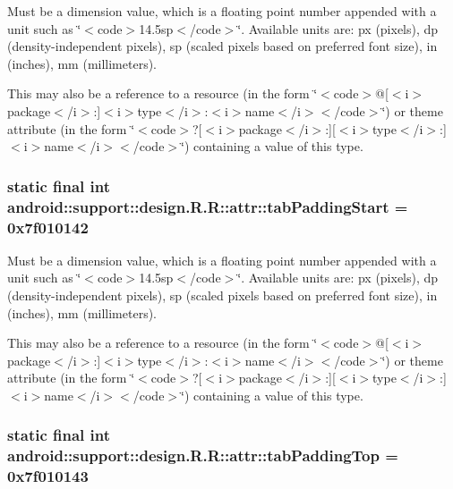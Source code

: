 Must be a dimension value, which is a floating point number appended with a unit such as \char`\"{}$<$code$>$14.5sp$<$/code$>$\char`\"{}. Available units are: px (pixels), dp (density-independent pixels), sp (scaled pixels based on preferred font size), in (inches), mm (millimeters). 

This may also be a reference to a resource (in the form \char`\"{}$<$code$>$@\mbox{[}$<$i$>$package$<$/i$>$:\mbox{]}$<$i$>$type$<$/i$>$:$<$i$>$name$<$/i$>$$<$/code$>$\char`\"{}) or theme attribute (in the form \char`\"{}$<$code$>$?\mbox{[}$<$i$>$package$<$/i$>$:\mbox{]}\mbox{[}$<$i$>$type$<$/i$>$:\mbox{]}$<$i$>$name$<$/i$>$$<$/code$>$\char`\"{}) containing a value of this type. \hypertarget{classandroid_1_1support_1_1design_1_1_r_1_1attr_8b9374c181f91660a0774ca00635ff2d}{
\subsubsection[{tabPaddingStart}]{\setlength{\rightskip}{0pt plus 5cm}static final int android::support::design.R.R::attr::tabPaddingStart = 0x7f010142}}
\label{classandroid_1_1support_1_1design_1_1_r_1_1attr_8b9374c181f91660a0774ca00635ff2d}


Must be a dimension value, which is a floating point number appended with a unit such as \char`\"{}$<$code$>$14.5sp$<$/code$>$\char`\"{}. Available units are: px (pixels), dp (density-independent pixels), sp (scaled pixels based on preferred font size), in (inches), mm (millimeters). 

This may also be a reference to a resource (in the form \char`\"{}$<$code$>$@\mbox{[}$<$i$>$package$<$/i$>$:\mbox{]}$<$i$>$type$<$/i$>$:$<$i$>$name$<$/i$>$$<$/code$>$\char`\"{}) or theme attribute (in the form \char`\"{}$<$code$>$?\mbox{[}$<$i$>$package$<$/i$>$:\mbox{]}\mbox{[}$<$i$>$type$<$/i$>$:\mbox{]}$<$i$>$name$<$/i$>$$<$/code$>$\char`\"{}) containing a value of this type. \hypertarget{classandroid_1_1support_1_1design_1_1_r_1_1attr_a578a35d4411dc28a9ca3ca3013d0c6d}{
\subsubsection[{tabPaddingTop}]{\setlength{\rightskip}{0pt plus 5cm}static final int android::support::design.R.R::attr::tabPaddingTop = 0x7f010143}}
\label{classandroid_1_1support_1_1design_1_1_r_1_1attr_a578a35d4411dc28a9ca3ca3013d0c6d}


